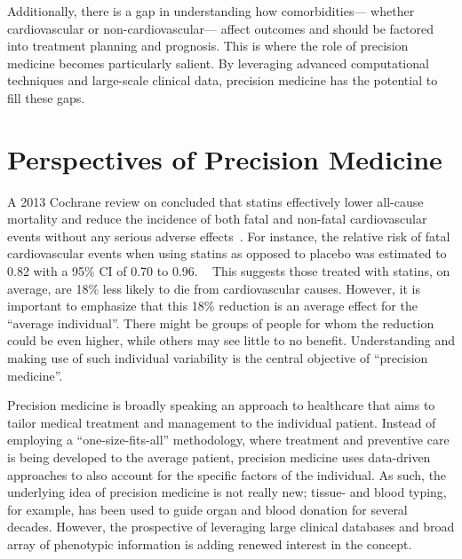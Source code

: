 Additionally, there is a gap in understanding how comorbidities---%
whether cardiovascular or non-cardiovascular---%
affect outcomes and should be factored into treatment planning and prognosis.%
This is where the role of precision medicine becomes particularly salient. 
By leveraging advanced computational techniques and large-scale clinical data,
precision medicine has the potential to fill these gaps.

\section{Perspectives of Precision Medicine}

A 2013 Cochrane review on  concluded 
that statins effectively lower all-cause mortality and reduce the incidence
of both fatal and non-fatal cardiovascular events without any serious
adverse effects~\autocite{taylorStatins2013}.
For instance, the relative risk of fatal cardiovascular events 
when using statins as opposed to placebo
was estimated to \num{0.82} with a 
\si{95}{\%} \ac{CI} of \num{0.70} to \num{0.96}.
~\autocite{taylorStatins2013}
This suggests those treated with statins, on average,
are \si{18}{\%} less likely to die from cardiovascular causes. 
However, it is important to emphasize that this \si{18}{\%} 
reduction is an average effect for the \enquote{average individual}.
There might be groups of people for whom the reduction could be 
even higher, while others may see little to no benefit. 
Understanding and making use of such individual variability 
is the central objective of \enquote{precision medicine}.

Precision medicine is broadly speaking an approach to healthcare 
that aims to tailor medical treatment and management to the individual patient.
Instead of employing a \enquote{one-size-fits-all} methodology, 
where treatment and preventive care is being developed to the average patient,
precision medicine uses data-driven approaches to also account for 
the specific factors of the individual.
As such, the underlying idea of precision medicine is not really new;
tissue- and blood typing, for example,  
has been used to guide organ and blood donation for several decades.
However, the prospective of leveraging large clinical databases
and broad array of phenotypic information is adding renewed interest 
in the concept.
~\autocite{collinsNew2015}

